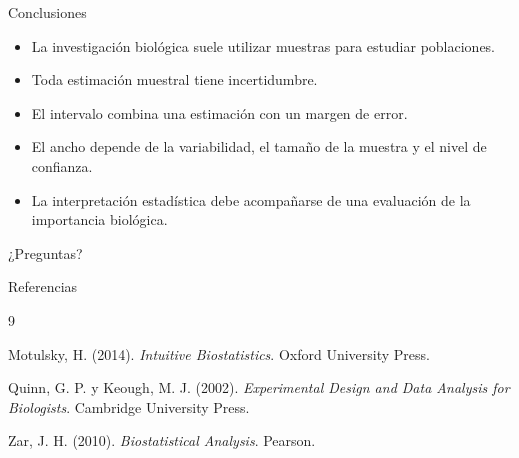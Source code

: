 \documentclass[aspectratio=169,11pt]{beamer}
\begin{document}
\begin{frame}{Conclusiones}
\begin{itemize} \itemsep .5em
    \item La investigación biológica suele utilizar
    muestras para estudiar poblaciones.
    \item Toda estimación muestral tiene incertidumbre.
    \item El intervalo combina una estimación con
    un margen de error.
    \item El ancho depende de la variabilidad, el tamaño
    de la muestra y el nivel de confianza.
    \item La interpretación estadística debe acompañarse
    de una evaluación de la importancia biológica.
\end{itemize}

\vspace{0.5cm}
\begin{center}
\Large ¿Preguntas?
\end{center}
\end{frame}

\begin{frame}{Referencias}
\small
\begin{thebibliography}{9}

Motulsky, H. (2014).
\textit{Intuitive Biostatistics}.
Oxford University Press.

Quinn, G. P. y Keough, M. J. (2002).
\textit{Experimental Design and Data Analysis for Biologists}.
Cambridge University Press.

Zar, J. H. (2010).
\textit{Biostatistical Analysis}.
Pearson.

\end{thebibliography}
\end{frame}
\end{document}
